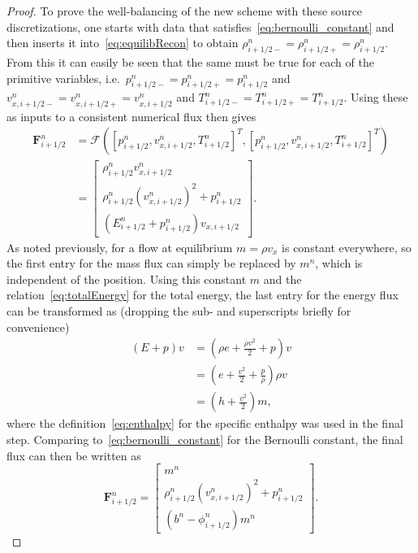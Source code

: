 \begin{proof}
To prove the well-balancing of the new scheme with these source discretizations, one starts with data that satisfies~\eqref{eq:bernoulli_constant} and then inserts it into~\eqref{eq:equilibRecon} to obtain $\rho_{i+1/2-}^n=\rho_{i+1/2+}^n=\rho_{i+1/2}^n$. From this it can easily be seen that the same must be true for each of the primitive variables, i.e.\ $p_{i+1/2-}^n=p_{i+1/2+}^n=p_{i+1/2}^n$ and $v_{x,i+1/2-}^n=v_{x,i+1/2+}^n=v_{x,i+1/2}^n$ and $T_{i+1/2-}^n=T_{i+1/2+}^n=T_{i+1/2}^n$. Using these as inputs to a consistent numerical flux then gives
\begin{align*}
\mathbf{F}_{i+1/2}^n&=\bm{\mathcal{F}}\left([p_{i+1/2}^n,v_{x,i+1/2}^n,T_{i+1/2}^n]^T,[p_{i+1/2}^n,v_{x,i+1/2}^n,T_{i+1/2}^n]^T\right) \\
&=
\begin{bmatrix}
\rho_{i+1/2}^n v_{x,i+1/2}^n \\ \rho_{i+1/2}^n\left(v_{x,i+1/2}^n\right)^2+p_{i+1/2}^n \\ \left(E_{i+1/2}^n+p_{i+1/2}^n\right)v_{x,i+1/2}
\end{bmatrix}.
\end{align*}
As noted previously, for a flow at equilibrium $m=\rho v_x$ is constant everywhere, so the first entry for the mass flux can simply be replaced by $m^n$, which is independent of the position. Using this constant $m$ and the relation~\eqref{eq:totalEnergy} for the total energy, the last entry for the energy flux can be transformed as (dropping the sub- and superscripts briefly for convenience)
\begin{align*}
\left(E+p\right)v&=\left(\rho e + \frac{\rho v^2}{2}+p\right)v \\
&=\left(e + \frac{v^2}{2}+\frac{p}{\rho}\right)\rho v \\
&=\left(h + \frac{v^2}{2}\right)m,
\end{align*}
where the definition~\eqref{eq:enthalpy} for the specific enthalpy was used in the final step. Comparing to~\eqref{eq:bernoulli_constant} for the Bernoulli constant, the final flux can then be written as
\begin{equation*}
\mathbf{F}_{i+1/2}^n=
\begin{bmatrix}
m^n \\ \rho_{i+1/2}^n\left(v_{x,i+1/2}^n\right)^2+p_{i+1/2}^n \\ \left(b^n-\phi_{i+1/2}^n\right)m^n
\end{bmatrix}.
\end{equation*}

\end{proof}
